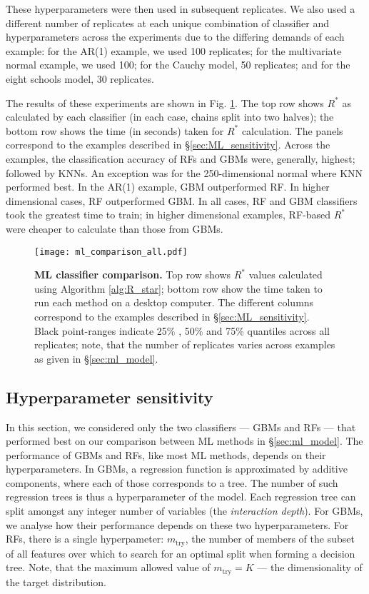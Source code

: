 \documentclass{article}
\begin{document}
These hyperparameters were then used in subsequent replicates. We also used a different number of replicates at each unique combination of classifier and hyperparameters across the experiments due to the differing demands of each example: for the AR(1) example, we used 100 replicates; for the multivariate normal example, we used 100; for the Cauchy model, 50 replicates; and for the eight schools model, 30 replicates.

The results of these experiments are shown in Fig. \ref{fig:ml_comparison_all}. The top row shows $R^*$ as calculated by each classifier (in each case, chains split into two halves); the bottom row shows the time (in seconds) taken for $R^*$ calculation. The panels correspond to the examples described in \S\ref{sec:ML_sensitivity}. Across the examples, the classification accuracy of RFs and GBMs were, generally, highest; followed by KNNs. An exception was for the 250-dimensional normal where KNN performed best. In the AR(1) example, GBM outperformed RF. In higher dimensional cases, RF outperformed GBM. In all cases, RF and GBM classifiers took the greatest time to train; in higher dimensional examples, RF-based $R^*$ were cheaper to calculate than those from GBMs.


\begin{figure}[!htb]
	\centerline{\texttt{[image: ml\_comparison\_all.pdf]}}
	\caption{\textbf{ML classifier comparison.} Top row shows $R^*$ values calculated using Algorithm \ref{alg:R_star}; bottom row show the time taken to run each method on a desktop computer. The different columns correspond to the examples described in \S\ref{sec:ML_sensitivity}. Black point-ranges indicate 25\% , 50\% and 75\% quantiles across all replicates; note, that the number of replicates varies across examples as given in \S\ref{sec:ml_model}.}
	\label{fig:ml_comparison_all}
\end{figure}

\color{black}

\color{red}
\subsection{Hyperparameter sensitivity}\label{sec:hyperparameters}
In this section, we considered only the two classifiers — GBMs and RFs — that performed best on our comparison between ML methods in \S\ref{sec:ml_model}. The performance of GBMs and RFs, like most ML methods, depends on their hyperparameters. In GBMs, a regression function is approximated by additive components, where each of those corresponds to a tree. The number of such regression trees is thus a hyperparameter of the model. Each regression tree can split amongst any integer number of variables (the \textit{interaction depth}). For GBMs, we analyse how their performance depends on these two hyperparameters. For RFs, there is a single hyperpameter: $m_{\text{try}}$, the number of members of the subset of all features over which to search for an optimal split when forming a decision tree. Note, that the maximum allowed value of $m_{\text{try}}=K$ — the dimensionality of the target distribution. 
\end{document}
